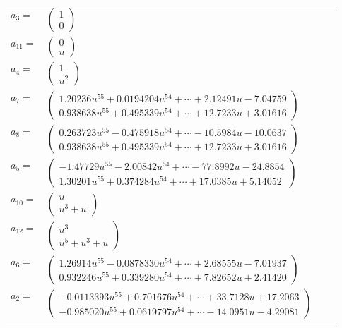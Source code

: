 \documentclass[1p]{elsarticle_modified}
\theoremstyle{definition}
\begin{document}
\begin{tabular}{m{7pt} m{180pt} m{7pt} m{180pt} }
\flushright $a_{3}=$&$\begin{pmatrix}1\\0\end{pmatrix}$ \\
\flushright $a_{11}=$&$\begin{pmatrix}0\\u\end{pmatrix}$ \\
\flushright $a_{4}=$&$\begin{pmatrix}1\\u^2\end{pmatrix}$ \\
\flushright $a_{7}=$&$\begin{pmatrix}1.20236 u^{55}+0.0194204 u^{54}+\cdots+2.12491 u-7.04759\\0.938638 u^{55}+0.495339 u^{54}+\cdots+12.7233 u+3.01616\end{pmatrix}$ \\
\flushright $a_{8}=$&$\begin{pmatrix}0.263723 u^{55}-0.475918 u^{54}+\cdots-10.5984 u-10.0637\\0.938638 u^{55}+0.495339 u^{54}+\cdots+12.7233 u+3.01616\end{pmatrix}$ \\
\flushright $a_{5}=$&$\begin{pmatrix}-1.47729 u^{55}-2.00842 u^{54}+\cdots-77.8992 u-24.8854\\1.30201 u^{55}+0.374284 u^{54}+\cdots+17.0385 u+5.14052\end{pmatrix}$ \\
\flushright $a_{10}=$&$\begin{pmatrix}u\\u^3+u\end{pmatrix}$ \\
\flushright $a_{12}=$&$\begin{pmatrix}u^3\\u^5+u^3+u\end{pmatrix}$ \\
\flushright $a_{6}=$&$\begin{pmatrix}1.26914 u^{55}-0.0878330 u^{54}+\cdots+2.68555 u-7.01937\\0.932246 u^{55}+0.339280 u^{54}+\cdots+7.82652 u+2.41420\end{pmatrix}$ \\
\flushright $a_{2}=$&$\begin{pmatrix}-0.0113393 u^{55}+0.701676 u^{54}+\cdots+33.7128 u+17.2063\\-0.985020 u^{55}+0.0619797 u^{54}+\cdots-14.0951 u-4.29081\end{pmatrix}$ \\

\end{tabular}
\end{document}
